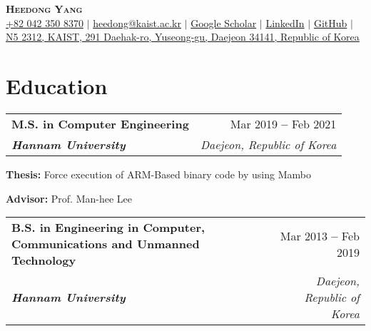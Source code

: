 \documentclass[letterpaper,11pt]{article}
\makeatletter
\newcommand{\resumeEducationHeading}[4]{
  \vspace{-2pt}\item
    \begin{tabular*}{0.97\textwidth}[t]{l@{\extracolsep{\fill}}r}
      \textbf{#1} & #2 \\
      \textit{\textbf{\small#3}} & \textit{\small #4} \\
    \end{tabular*}\vspace{-5pt}
}
\newcommand{\resumeSubHeadingListStart}{\begin{itemize}[leftmargin=0.2in]}
\newcommand{\resumeSubHeadingListEnd}{\end{itemize}}
\newcommand{\resumeSubHeadingItemListStart}{\begin{itemize}[label=-, leftmargin=0.15in]}
\newcommand{\resumeSubHeadingItemListEnd}{\end{itemize}\vspace{-5pt}}
\makeatother
\begin{document}

\begin{center}
    \textbf{\Huge \scshape Heedong Yang} \\ \vspace{7pt}
    \small
    \faMobile \hspace{.5pt} \href{tel:820423508370}{+82 042 350 8370}
    $|$
    \faEnvelope \hspace{.5pt} \href{mailto:heedong@kaist.ac.kr}{heedong@kaist.ac.kr}
    $|$
    \faGraduationCap \hspace{.5pt} \href{https://scholar.google.co.kr/citations?user=Gqegeu0AAAAJ}{Google Scholar}
    $|$
    \faLinkedinSquare \hspace{.5pt} \href{https://www.linkedin.com/in/heedongy}{LinkedIn}
    $|$
    \faGithub \hspace{.5pt} \href{https://github.com/heedong2y}{GitHub}
    $|$ \\
    \faMapMarker \hspace{.5pt} \href{https://www.google.com/maps/place/KAIST+%EC%9C%B5%ED%95%A9%EC%97%B0%EA%B5%AC%EB%8F%99+(N5)/data=!4m6!3m5!1s0x35654bca45175ce3:0xb89a3db6416dea2c!8m2!3d36.3740132!4d127.3639474!16s%2Fg%2F119wl0_vz?entry=ttu}{N5 2312, KAIST, 291 Daehak-ro, Yuseong-gu, Daejeon 34141, Republic of Korea}
\end{center}




\section{Education}
  \vspace{3pt}
  \resumeSubHeadingListStart
   \resumeEducationHeading
     {M.S. in Computer Engineering}   %
     {Mar 2019 \textbf{--} Feb 2021}
     {Hannam University}{Daejeon, Republic of Korea}
        \resumeSubHeadingItemListStart
        \small{\item{\textbf{Thesis:} Force execution of ARM-Based binary code by using Mambo}
        \item{\textbf{Advisor:} Prof. Man-hee Lee}}
        \resumeSubHeadingItemListEnd
    \resumeEducationHeading
      {B.S. \small{in Engineering in Computer, Communications and Unmanned Technology}}
      {Mar 2013 \textbf{--} Feb 2019}
      {Hannam University}{Daejeon, Republic of Korea}
  \resumeSubHeadingListEnd
\end{document}
